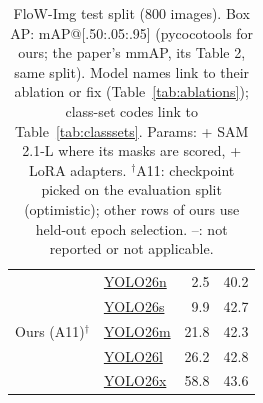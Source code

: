 \begin{table}[t]
\begin{tabular}{l|lrc}
\multirow{5}{*}{Ours (A11)$^\dagger$} & \hyperlink{abl:A11}{YOLO26n} & 2.5 & 40.2 \\
 & \hyperlink{abl:A11}{YOLO26s} & 9.9 & 42.7 \\
 & \hyperlink{abl:A11}{YOLO26m} & 21.8 & 42.3 \\
 & \hyperlink{abl:A11}{YOLO26l} & 26.2 & 42.8 \\
 & \hyperlink{abl:A11}{YOLO26x} & 58.8 & 43.6 \\
\bottomrule
\end{tabular}
\caption{FloW-Img test split (800 images). Box AP: mAP@[.50:.05:.95] (pycocotools for ours; the paper's mmAP, its Table 2, same split). Model names link to their ablation or fix (Table~\ref{tab:ablations}); class-set codes link to Table~\ref{tab:classsets}. Params: + SAM 2.1-L where its masks are scored, + LoRA adapters. $^\dagger$A11: checkpoint picked on the evaluation split (optimistic); other rows of ours use held-out epoch selection. --: not reported or not applicable.}
\label{tab:results_flow}
\end{table}

